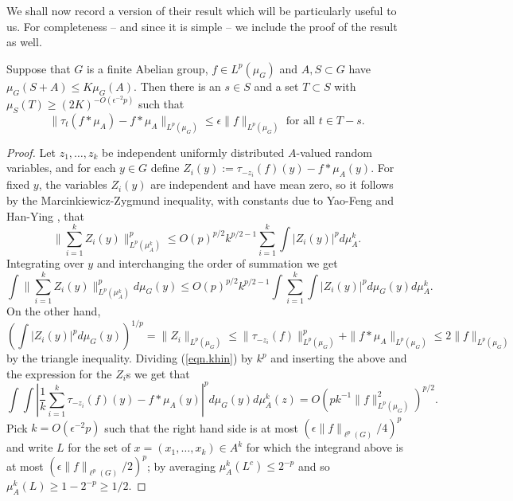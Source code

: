 \documentclass[12pt]{amsart}  %
\begin{document}
We shall now record a version of their result which will be particularly useful to us.  For completeness -- and since it is simple -- we include the proof of the result as well.
\begin{lemma}\label{lem.cs}  Suppose that $G$ is a finite Abelian group, $f \in L^p(\mu_G)$ and $A,S \subset G$ have $\mu_G(S+A) \leq K\mu_G(A)$.  Then there is an $s \in S$ and a set $T \subset S$ with $\mu_S(T)  \geq (2K)^{-O(\epsilon^{-2}p)}$ such that
\begin{equation*}
\|\tau_t(f \ast \mu_A) - f \ast \mu_A\|_{L^p(\mu_G)} \leq \epsilon \|f\|_{L^p(\mu_G)} \textrm{ for all } t \in T-s.
\end{equation*}
\end{lemma}
\begin{proof}
Let $z_1,\dots,z_k$ be independent uniformly distributed $A$-valued random variables, and for each $y \in G$ define $Z_i(y):=\tau_{-z_i}(f)(y) - f \ast \mu_A(y)$.  For fixed $y$, the variables $Z_i(y)$ are independent and have mean zero, so it follows by the Marcinkiewicz-Zygmund inequality, with constants due to Yao-Feng and Han-Ying \cite[Theorem 2]{yaohan::}, that
\begin{equation*}
\| \sum_{i=1}^k{Z_i(y)}\|_{L^p(\mu_A^k)}^p \leq  O(p)^{p/2}k^{p/2-1}\sum_{i=1}^k{\int{|Z_i(y)|^p}d\mu_A^k}.
\end{equation*}
Integrating over $y$ and interchanging the order of summation we get
\begin{equation}\label{eqn.khin}
\int{\| \sum_{i=1}^k{Z_i(y)}\|_{L^p(\mu_A^k)}^pd\mu_G(y)} \leq O(p)^{p/2}k^{p/2-1}\int{\sum_{i=1}^k{\int{|Z_i(y)|^p}d\mu_G(y)}d\mu_{A}^k}.
\end{equation}
On the other hand,
\begin{equation*}
\left(\int{|Z_i(y)|^pd\mu_G(y)}\right)^{1/p} =\|Z_i\|_{L^p(\mu_G)} \leq \|\tau_{-z_i}(f)\|_{L^p(\mu_G)}^p + \|f \ast \mu_A\|_{L^p(\mu_G)} \leq 2\|f\|_{L^p(\mu_G)}
\end{equation*}
by the triangle inequality.  Dividing (\ref{eqn.khin}) by $k^p$ and inserting the above and the expression for the $Z_i$s we get that
\begin{equation*}
\int{\int{\left|\frac{1}{k}\sum_{i=1}^k{\tau_{-z_i}(f)(y)} - f \ast \mu_A(y)\right|^pd\mu_G(y)}d\mu_A^k(z)}=O(pk^{-1}\|f\|_{L^p(\mu_G)}^2)^{p/2}.
\end{equation*}
Pick $k=O(\epsilon^{-2}p)$ such that the right hand side is at most $(\epsilon \|f\|_{\ell^p(G)}/4)^p$ and write $L$ for the set of $x=(x_1,\dots,x_k) \in A^k$ for which the integrand above is at most $(\epsilon \|f\|_{\ell^p(G)}/2)^p$; by averaging $\mu_A^k(L^c) \leq 2^{-p}$ and so $\mu_A^k(L) \geq 1-2^{-p} \geq 1/2$.


\end{proof}
\end{document}
